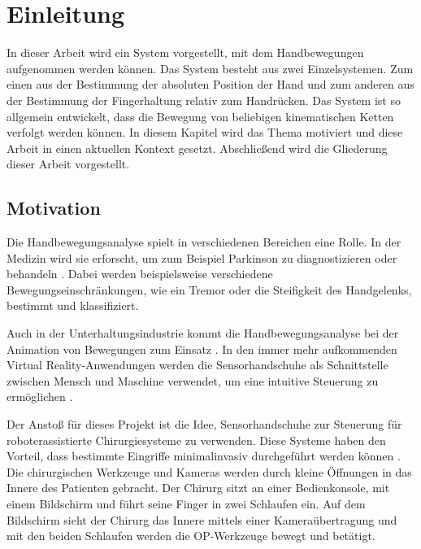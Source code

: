 \chapter{Einleitung}
\label{chap:01_einleitung}

In dieser Arbeit wird ein System vorgestellt, mit dem Handbewegungen aufgenommen werden können. Das System besteht aus zwei Einzelsystemen. Zum einen aus der Bestimmung der absoluten Position der Hand und 
zum anderen aus der Bestimmung der Fingerhaltung relativ zum Handrücken. Das System ist so allgemein entwickelt, 
dass die Bewegung von beliebigen kinematischen Ketten verfolgt werden können. In diesem Kapitel wird das Thema motiviert und diese Arbeit in einen aktuellen Kontext gesetzt. Abschließend wird die Gliederung dieser Arbeit vorgestellt.

   \section{Motivation}
   \label{sec:01_motivation}
   Die Handbewegungsanalyse spielt in verschiedenen Bereichen eine Rolle. In der Medizin wird sie erforscht, um zum Beispiel Parkinson zu diagnostizieren oder behandeln \cite{lugo_virtual_2017}. Dabei werden beispielsweise verschiedene Bewegungseinschränkungen, wie ein Tremor oder die Steifigkeit des Handgelenks, bestimmt und klassifiziert. 
   
   Auch in der Unterhaltungsindustrie kommt die Handbewegungsanalyse bei der Animation von Bewegungen zum Einsatz \cite{noauthor_intuitive_nodate}. In den immer mehr aufkommenden Virtual Reality-Anwendungen werden die Sensorhandschuhe als Schnittstelle zwischen Mensch und Maschine verwendet, um eine intuitive Steuerung zu ermöglichen \cite{yi_magnetic_2022}.

   Der Anstoß für dieses Projekt ist die Idee, Sensorhandschuhe zur Steuerung für roboterassistierte Chirurgiesysteme zu verwenden. Diese Systeme haben den Vorteil, dass bestimmte Eingriffe minimalinvasiv durchgeführt werden können \cite{fan_advantages_2025}. Die chirurgischen Werkzeuge und Kameras werden durch kleine Öffnungen in das Innere des Patienten gebracht. Der Chirurg sitzt an einer Bedienkonsole, mit einem Bildschirm und führt seine Finger in zwei Schlaufen ein. Auf dem Bildschirm sieht der Chirurg das Innere mittels einer Kameraübertragung und mit den beiden Schlaufen werden die OP-Werkzeuge bewegt und betätigt. 
   
